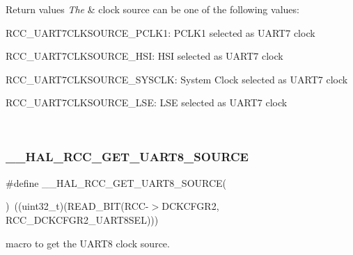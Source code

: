 \begin{DoxyRetVals}{Return values}
{\em The} & clock source can be one of the following values\+: \begin{DoxyItemize}
\item R\+C\+C\+\_\+\+U\+A\+R\+T7\+C\+L\+K\+S\+O\+U\+R\+C\+E\+\_\+\+P\+C\+L\+K1\+: P\+C\+L\+K1 selected as U\+A\+R\+T7 clock \item R\+C\+C\+\_\+\+U\+A\+R\+T7\+C\+L\+K\+S\+O\+U\+R\+C\+E\+\_\+\+H\+SI\+: H\+SI selected as U\+A\+R\+T7 clock \item R\+C\+C\+\_\+\+U\+A\+R\+T7\+C\+L\+K\+S\+O\+U\+R\+C\+E\+\_\+\+S\+Y\+S\+C\+LK\+: System Clock selected as U\+A\+R\+T7 clock \item R\+C\+C\+\_\+\+U\+A\+R\+T7\+C\+L\+K\+S\+O\+U\+R\+C\+E\+\_\+\+L\+SE\+: L\+SE selected as U\+A\+R\+T7 clock \end{DoxyItemize}
\\
\hline
\end{DoxyRetVals}
\mbox{\label{group___r_c_c_ex___exported___macros_gace745b2a77de9c74e19d6d029869fe5b}} 
\subsubsection{\texorpdfstring{\_\_HAL\_RCC\_GET\_UART8\_SOURCE}{\_\_HAL\_RCC\_GET\_UART8\_SOURCE}}
{\footnotesize\ttfamily \#define \+\_\+\+\_\+\+H\+A\+L\+\_\+\+R\+C\+C\+\_\+\+G\+E\+T\+\_\+\+U\+A\+R\+T8\+\_\+\+S\+O\+U\+R\+CE(\begin{DoxyParamCaption}{ }\end{DoxyParamCaption})~((uint32\+\_\+t)(R\+E\+A\+D\+\_\+\+B\+IT(R\+CC-\/$>$D\+C\+K\+C\+F\+G\+R2, R\+C\+C\+\_\+\+D\+C\+K\+C\+F\+G\+R2\+\_\+\+U\+A\+R\+T8\+S\+EL)))}



macro to get the U\+A\+R\+T8 clock source. 


